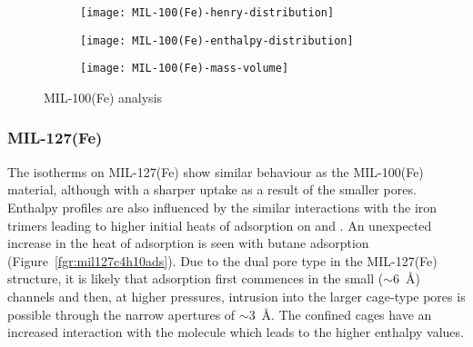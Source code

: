 \begin{figure}
    \centering
    \begin{subfigure}{0.8\textwidth}
        \parbox[c]{0.1\linewidth}{\caption{}\label{fig:analysismil100henry}}%
        \parbox[b]{0.7\linewidth}{%
        \texttt{[image: MIL-100(Fe)-henry-distribution]}%
        }%
    \end{subfigure}

    \begin{subfigure}{0.8\textwidth}
        \parbox[c]{0.1\linewidth}{\caption{}\label{fig:analysismil100enth}}%
        \parbox[b]{0.7\linewidth}{%
        \texttt{[image: MIL-100(Fe)-enthalpy-distribution]}%
        }%
    \end{subfigure}

    \begin{subfigure}{0.8\textwidth}
        \parbox[c]{0.1\linewidth}{\caption{}\label{fig:analysismil100basis}}%
        \parbox[b]{0.7\linewidth}{%
        \texttt{[image: MIL-100(Fe)-mass-volume]}%
        }%
    \end{subfigure}
    
    \caption{MIL-100(Fe) analysis}%
    \label{fig:analysismil100}
\end{figure}

\subsubsection{MIL-127(Fe)}

The isotherms on MIL-127(Fe) show similar behaviour as the MIL-100(Fe) material,
although with a sharper uptake as a result of the smaller pores. Enthalpy 
profiles are also influenced by the similar interactions with the iron 
trimers leading to higher initial heats of adsorption on  and .
An unexpected increase in the heat of adsorption is seen with 
butane adsorption (Figure~\ref{fgr:mil127c4h10ads}). Due to the dual pore 
type in the MIL-127(Fe) structure,
it is likely that adsorption first commences in the small (\( \sim \)\SI{6}{\angstrom})
channels and then, at higher pressures, intrusion into the larger cage-type
pores is possible through the narrow apertures of \( \sim \)\SI{3}{\angstrom}. 
The confined cages have an increased interaction with the molecule which 
leads to the higher enthalpy values.

